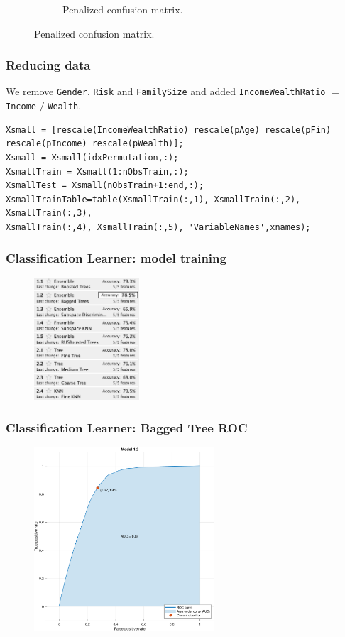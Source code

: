 \documentclass{beamer}
\begin{document}
\begin{frame}
\begin{figure}
\begin{subfigure}[t]{0.48\textwidth}
            \caption{Penalized confusion matrix.}
        \end{subfigure}
    \end{figure}
\end{frame}

\begin{frame}[fragile]
\frametitle{Reducing data}
We remove \texttt{Gender}, \texttt{Risk} and \texttt{FamilySize} and added \texttt{IncomeWealthRatio} $=$ \texttt{Income} $/$ \texttt{Wealth}.
\tiny
\begin{verbatim}
Xsmall = [rescale(IncomeWealthRatio) rescale(pAge) rescale(pFin) rescale(pIncome) rescale(pWealth)];
Xsmall = Xsmall(idxPermutation,:);
XsmallTrain = Xsmall(1:nObsTrain,:);
XsmallTest = Xsmall(nObsTrain+1:end,:);
XsmallTrainTable=table(XsmallTrain(:,1), XsmallTrain(:,2), XsmallTrain(:,3),
XsmallTrain(:,4), XsmallTrain(:,5), 'VariableNames',xnames);
\end{verbatim}
\end{frame}

\begin{frame}
    \frametitle{Classification Learner: model training}
    \begin{figure}
    	\centering
    	\includegraphics[width=0.35\textwidth]{modelstrained_small}
    \end{figure}
\end{frame}

\begin{frame}
    \frametitle{Classification Learner: Bagged Tree ROC}
    \begin{figure}
    	\centering
    	\includegraphics[width=0.6\textwidth]{cl_2_roc}
    \end{figure}
\end{frame}
\end{document}
